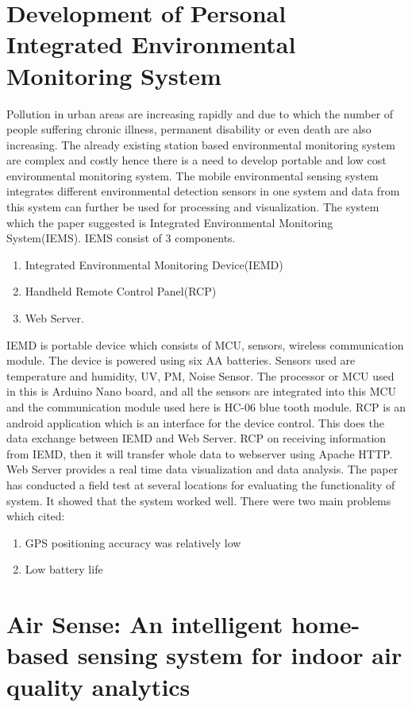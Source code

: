 \documentclass[11pt]{article}
\begin{document}
\section{Development of Personal Integrated Environmental Monitoring System}\cite{Wong2014}

Pollution in urban areas are increasing rapidly and due to which the number of people suffering chronic illness, permanent disability or even death are also increasing. The already existing station based environmental monitoring system are complex and costly hence there is a need to develop portable and low cost environmental monitoring system. The mobile environmental sensing system integrates different environmental detection sensors in one system and data from this system can further be used for processing and visualization. The system which the paper suggested is Integrated Environmental Monitoring System(IEMS). IEMS consist of 3 components.
\begin{enumerate}
\item	Integrated Environmental Monitoring Device(IEMD)
\item	Handheld Remote Control Panel(RCP)
\item	Web Server.
\end{enumerate}
IEMD is portable device which consists of MCU, sensors, wireless communication module. The device is powered using six AA batteries. Sensors used are temperature and humidity, UV, PM, Noise Sensor.
The processor or MCU used in this is Arduino Nano board, and all the sensors are integrated into this MCU and the communication module used here is HC-06 blue tooth module.
RCP is an android application which is an interface for the device control. This does the data exchange between IEMD and Web Server. RCP on receiving information from IEMD, then it will transfer whole data to webserver using Apache HTTP.
Web Server provides a real time data visualization and data analysis. The paper has conducted a field test at several locations for evaluating the functionality of system. It showed that the system worked well. There were two main problems which cited:
\begin{enumerate}
\item GPS positioning accuracy was relatively low
\item Low battery life
\end{enumerate}



\section{Air Sense: An intelligent home-based sensing system for indoor air quality analytics}\cite{Fang2016}
\end{document}
